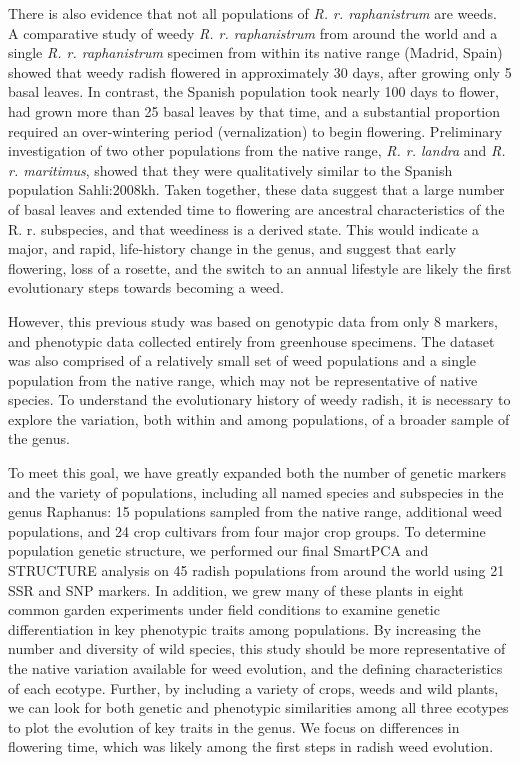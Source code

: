 \documentclass[twocolumn]{bmcart}%
\begin{document}
There is also evidence that not all populations of \textit{R. r. raphanistrum} are weeds. A comparative study of weedy \textit{R. r. raphanistrum} from around the world and a single \textit{R. r. raphanistrum} specimen from within its native range (Madrid, Spain) showed that weedy radish flowered in approximately 30 days, after growing only 5 basal leaves. In contrast, the Spanish population took nearly 100 days to flower, had grown more than 25 basal leaves by that time, and a substantial proportion required an over-wintering period (vernalization) to begin flowering. Preliminary investigation of two other populations from the native range, \textit{R. r. landra} and \textit{R. r. maritimus}, showed that they were qualitatively similar to the Spanish population {Sahli:2008kh}. Taken together, these data suggest that a large number of basal leaves and extended time to flowering are ancestral characteristics of the R. r. subspecies, and that weediness is a derived state. This would indicate a major, and rapid, life-history change in the genus, and suggest that early flowering, loss of a rosette, and the switch to an annual lifestyle are likely the first evolutionary steps towards becoming a weed.

However, this previous study was based on genotypic data from only 8 markers, and phenotypic data collected entirely from greenhouse specimens. The dataset was also comprised of a relatively small set of weed populations and a single population from the native range, which may not be representative of native species. To understand the evolutionary history of weedy radish, it is necessary to explore the variation, both within and among populations, of a broader sample of the genus.

To meet this goal, we have greatly expanded both the number of genetic markers and the variety of populations, including all named species and subspecies in the genus Raphanus: 15 populations sampled from the native range, additional weed populations, and 24 crop cultivars from four major crop groups. To determine population genetic structure, we performed our final SmartPCA and STRUCTURE analysis on 45 radish populations from around the world using 21 SSR and SNP markers. In addition, we grew many of these plants in eight common garden experiments under field conditions to examine genetic differentiation in key phenotypic traits among populations. By increasing the number and diversity of wild species, this study should be more representative of the native variation available for weed evolution, and the defining characteristics of each ecotype. Further, by including a variety of crops, weeds and wild plants, we can look for both genetic and phenotypic similarities among all three ecotypes to plot the evolution of key traits in the genus. We focus on differences in flowering time, which was likely among the first steps in radish weed evolution. 
\end{document}
